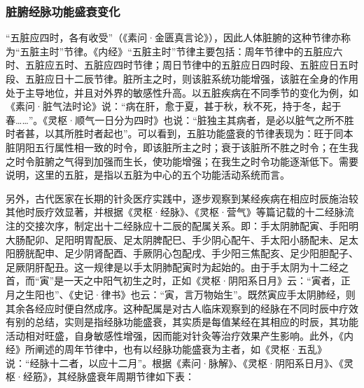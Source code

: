 \documentclass[draft,12pt]{ctexbook}
\begin{document}
\subsubsection{脏腑经脉功能盛衰变化}%

“五脏应四时，各有收受”（《素问·金匮真言论》），因此人体脏腑的这种节律亦称为“五脏主时”节律。《内经》“五脏主时”节律主要包括：周年节律中的五脏应六时、五脏应五时、五脏应四时节律；周日节律中的五脏应日四时段、五脏应日五时段、五脏应日十二辰节律。脏所主之时，则该脏系统功能增强，该脏在全身的作用处于主导地位，并且对外界的敏感性升高。以五脏疾病在不同季节的变化为例，如《素问·脏气法时论》说：“病在肝，愈于夏，甚于秋，秋不死，持于冬，起于春……”。《灵枢·顺气一日分为四时》也说：“脏独主其病者，是必以脏气之所不胜时者甚，以其所胜时者起也”。可以看到，五脏功能盛衰的节律表现为：旺于同本脏阴阳五行属性相一致的时令，即该脏所主之时；衰于该脏所不胜之时令；在生我之时令脏腑之气得到加强而生长，使功能增强；在我生之时令功能逐渐低下。需要说明，这里的五脏，是指以五脏为中心的五个功能活动系统而言。

另外，古代医家在长期的针灸医疗实践中，逐步观察到某经疾病在相应时辰施治较其他时辰疗效显著，并根据《灵枢·经脉》、《灵枢·营气》等篇记载的十二经脉流注的交接次序，制定出十二经脉应十二辰的配属关系。即：手太阴肺配寅、手阳明大肠配卯、足阳明胃配辰、足太阴脾配巳、手少阴心配午、手太阳小肠配未、足太阳膀胱配申、足少阴肾配酉、手厥阴心包配戌、手少阳三焦配亥、足少阳胆配子、足厥阴肝配丑。这一规律是以手太阴肺配寅时为起始的。由于手太阴为十二经之首，而“寅”是一天之中阳气初生之时，正如《灵枢·阴阳系日月》云：“寅者，正月之生阳也”、《史记·律书》也云：“寅，言万物始生”。既然寅应手太阴肺经，则其余各经应时便自然成序。这种配属是对古人临床观察到的经脉在不同时辰中疗效有别的总结，实则是指经脉功能盛衰，其实质是每值某经在其相应的时辰，其功能活动相对旺盛，自身敏感性增强，因而能对针灸等治疗效果产生影响。此外，《内经》所阐述的周年节律中，也有以经脉功能盛衰为主者，如《灵枢·五乱》说：“经脉十二者，以应十二月”。根据《素问·脉解》、《灵枢·阴阳系日月》、《灵枢·经筋》，其经脉盛衰年周期节律如下表：
\end{document}
